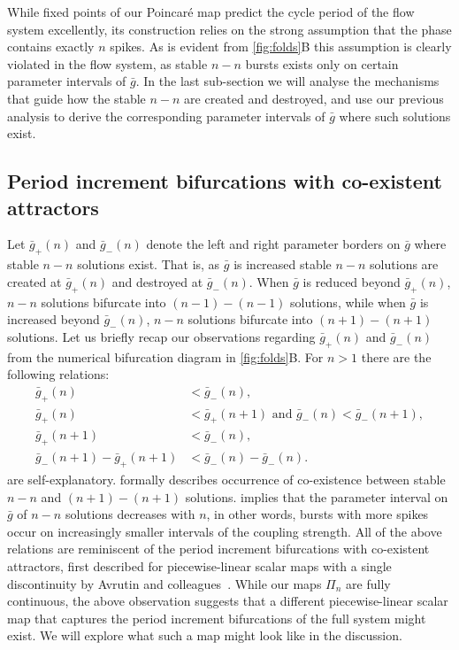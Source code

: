 While fixed points of our Poincaré map predict the cycle period of the flow system excellently, its construction relies on the strong assumption that the \free{} phase contains exactly \(n\) spikes.
As is evident from \cref{fig:folds}B this assumption is clearly violated in the flow system, as stable \(n-n\) bursts exists only on certain parameter intervals of \(\bar g\).
In the last sub-section we will analyse the mechanisms that guide how the stable \(n-n\) are created and destroyed, and use our previous analysis to derive the corresponding parameter intervals of \(\bar g\) where such solutions exist.

\subsection{Period increment bifurcations with co-existent attractors}
Let \(\bar g_+(n)\) and \(\bar g_-(n)\) denote the left and right parameter borders on \(\bar g\) where stable \(n-n\) solutions exist.
That is, as \(\bar g\) is increased stable \(n-n\) solutions are created at \(\bar g_+(n)\) and destroyed at \(\bar g_-(n)\).
When \(\bar g\) is reduced beyond \(\bar g_+(n)\), \(n-n\) solutions bifurcate into \((n-1)-(n-1)\) solutions, while when \(\bar g\) is increased beyond \(\bar g_-(n)\), \(n-n\) solutions bifurcate into \((n+1)-(n+1)\) solutions.
Let us briefly recap our observations regarding \(\bar g_+(n)\) and \(\bar g_-(n)\) from the numerical bifurcation diagram in \cref{fig:folds}B.
For \(n>1\) there are the following relations:
\begin{align}
	\bar g_+(n)                   & < \bar g_-(n)\label{eq:easy1},                                         \\
	\bar g_+(n)                   & < \bar g_+(n+1)\text{ and } \bar g_-(n)<\bar g_-(n+1)\label{eq:easy2}, \\
	\bar g_+(n+1)                 & < \bar g_-(n)\label{eq:coexistence},                                   \\
	\bar g_-(n+1) - \bar g_+(n+1) & < \bar g_-(n) - \bar g_-(n)\label{eq:robustness}.
\end{align}
 are self-explanatory.
 formally describes occurrence of co-existence between stable \(n-n\) and \((n+1)-(n+1)\) solutions.
 implies that the parameter interval on \(\bar g\) of \(n-n\) solutions decreases with \(n\), in other words, bursts with more spikes occur on increasingly smaller intervals of the coupling strength.
All of the above relations are reminiscent of the period increment bifurcations with co-existent attractors, first described for piecewise-linear scalar maps with a single discontinuity by Avrutin and colleagues~\cite[e.g.
	see][]{gardini2012,tramontana2012,avrutin2011,gardini2012}.
While our maps \(\Pi_n\) are fully continuous, the above observation suggests that a different piecewise-linear scalar map that captures the period increment bifurcations of the full system might exist.
We will explore what such a map might look like in the discussion.

